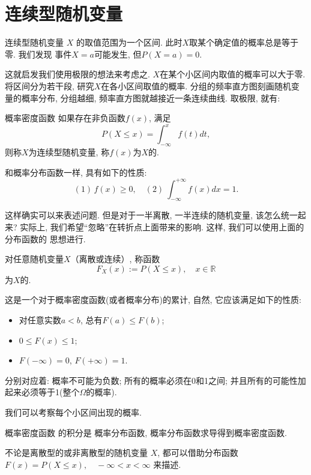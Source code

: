 \section{连续型随机变量}
连续型随机变量 $X$ 的取值范围为一个区间. 此时$X$取某个确定值的概率总是等于零. 我们发现
事件$X=a$可能发生, 但$P(X=a)=0$. 

这就启发我们使用极限的想法来考虑之. $X$在某个小区间内取值的概率可以大于零. 
将区间分为若干段, 研究$X$在各小区间取值的概率. 分组的频率直方图刻画随机变量的概率分布,
分组越细, 频率直方图就越接近一条连续曲线. 取极限, 就有:

\begin{definition}{概率密度函数}
    如果存在非负函数$f(x)$, 满足
    $$
        P(X\leq x)=\int_{-\infty}^{x}f(t)dt,
    $$
    则称$X$为连续型随机变量, 称$f(x)$为$X$的.
\end{definition}

和概率分布函数一样, 具有如下的性质:
$$
    (1)\,f(x)\ge 0,\quad (2)\ \int_{-\infty}^{+\infty}f(x)dx=1.
$$

这样确实可以来表述问题. 但是对于一半离散, 一半连续的随机变量, 该怎么统一起来?
实际上, 我们希望``忽略''在转折点上面带来的影响. 这样, 我们可以使用上面的分布函数的
思想进行.

\begin{definition}
    对任意随机变量$X$（离散或连续）, 称函数
    $$F_X(x):=P(X\le x),\quad x\in \mathbb{R}$$
    为$X$的. 
\end{definition}
这是一个对于概率密度函数(或者概率分布)的累计, 自然, 它应该满足如下的性质:

\begin{itemize}
    \item 对任意实数$a<b$, 总有$F(a)\le F(b)$;
    \item $0 \le F(x) \le 1$; 
    \item $F(-\infty)=0$, $F(+\infty)=1$. 
\end{itemize}
分别对应着: 概率不可能为负数; 所有的概率必须在0和1之间; 并且所有的可能性加起来必须等于1(整个$\Omega$的概率).
\begin{takeaway}
    我们可以考察每个小区间出现的概率.

    概率密度函数 的积分是 概率分布函数, 概率分布函数求导得到概率密度函数.

    不论是离散型的或非离散型的随机变量 $X$, 都可以借助分布函数$F(x)=P(X \leq x), \quad-\infty<x<\infty$
    来描述.
\end{takeaway}
